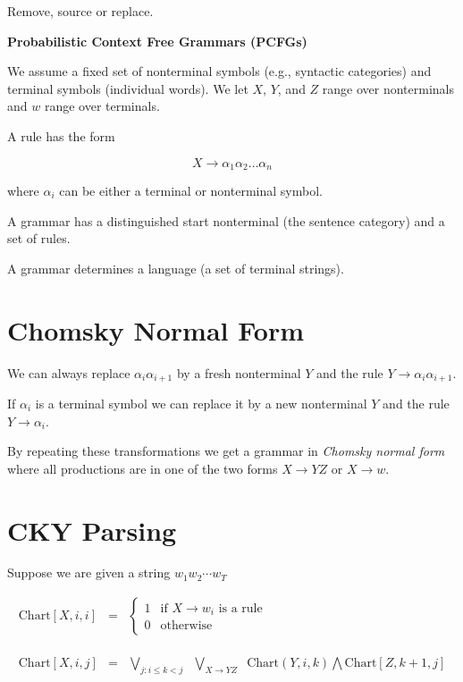Remove, source or replace.


\centerline{\Large \bf Probabilistic Context Free Grammars (PCFGs)}

\bigskip

We assume a fixed set of nonterminal symbols (e.g., syntactic categories) and terminal symbols (individual words).
We let $X$, $Y$, and $Z$ range over nonterminals and $w$ range over terminals.


A rule has the form

$$X \rightarrow \alpha_1\alpha_2\ldots\alpha_n$$

where $\alpha_i$ can be either a terminal or nonterminal symbol.

A grammar has a distinguished start nonterminal (the sentence category) and a set of rules.


A grammar determines a language (a set of terminal strings).

\section{Chomsky Normal Form}

We can always replace $\alpha_i\alpha_{i+1}$ by a fresh nonterminal $Y$ and the rule
$Y \rightarrow \alpha_i\alpha_{i+1}$.


If $\alpha_i$ is a terminal symbol we can replace it by a new nonterminal $Y$ and the rule $Y \rightarrow \alpha_i$.


By repeating these transformations we get a grammar in {\em Chomsky normal form} where all productions are in one of the two forms
$X \rightarrow YZ$ or $X \rightarrow w$.

\section{CKY Parsing}

Suppose we are given a string $w_1w_2\cdots w_T$


\begin{eqnarray*}
\mathrm{Chart}[X,i,i] & = & \left\{\begin{array}{ll}
                        1 & \mbox{if $X \rightarrow w_i$ is a rule} \\
			0 & \mbox{otherwise}
			\end{array}\right.
\\
\\
\\
\\
\mathrm{Chart}[X,i,j] & = & \bigvee_{j: i \leq k < j} \;\;\bigvee_{X \rightarrow YZ} \;\; \mathrm{Chart}(Y,i,k)\bigwedge\mathrm{Chart}[Z,k+1,j]
\end{eqnarray*}

